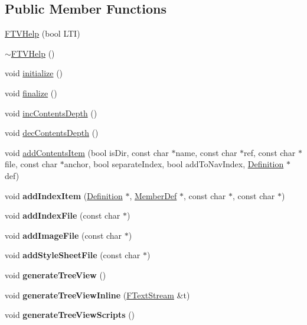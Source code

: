 \subsection*{Public Member Functions}
\begin{DoxyCompactItemize}
\item 
\mbox{\hyperlink{class_f_t_v_help_a7e7d72cccba33233dd89c6280b9ca101}{F\+T\+V\+Help}} (bool L\+TI)
\item 
\mbox{\hyperlink{class_f_t_v_help_aacb475096471a3b51feb4b247a41e27c}{$\sim$\+F\+T\+V\+Help}} ()
\item 
void \mbox{\hyperlink{class_f_t_v_help_a791c63d8c0dc72e7fedc4f17163dbfa3}{initialize}} ()
\item 
void \mbox{\hyperlink{class_f_t_v_help_a595c544e98100ca8aa84aaea4ac28e9f}{finalize}} ()
\item 
void \mbox{\hyperlink{class_f_t_v_help_a86381415dd788cb4a1a0feac8d5316d8}{inc\+Contents\+Depth}} ()
\item 
void \mbox{\hyperlink{class_f_t_v_help_a5949816300bc9d6a104dfd8305aa4e6f}{dec\+Contents\+Depth}} ()
\item 
void \mbox{\hyperlink{class_f_t_v_help_a33acc17460ca075c566e0e01d33a6ee4}{add\+Contents\+Item}} (bool is\+Dir, const char $\ast$name, const char $\ast$ref, const char $\ast$file, const char $\ast$anchor, bool separate\+Index, bool add\+To\+Nav\+Index, \mbox{\hyperlink{class_definition}{Definition}} $\ast$def)
\item 
\mbox{\label{class_f_t_v_help_ab6a465f8d11ddb4766cbdb130c6bde7e}} 
void {\bfseries add\+Index\+Item} (\mbox{\hyperlink{class_definition}{Definition}} $\ast$, \mbox{\hyperlink{class_member_def}{Member\+Def}} $\ast$, const char $\ast$, const char $\ast$)
\item 
\mbox{\label{class_f_t_v_help_af1158bffd161d730771c7dfc426b98a4}} 
void {\bfseries add\+Index\+File} (const char $\ast$)
\item 
\mbox{\label{class_f_t_v_help_a1e3bbb2160fc857187fbc8c1dfbeb20d}} 
void {\bfseries add\+Image\+File} (const char $\ast$)
\item 
\mbox{\label{class_f_t_v_help_a4b8566ef5fe3441f6e7e22bb7493f047}} 
void {\bfseries add\+Style\+Sheet\+File} (const char $\ast$)
\item 
\mbox{\label{class_f_t_v_help_a0fe4b6eab80d4602256ee5edd59b78df}} 
void {\bfseries generate\+Tree\+View} ()
\item 
\mbox{\label{class_f_t_v_help_aa5eeeb50fc575807ae4b0c6aa7c547bc}} 
void {\bfseries generate\+Tree\+View\+Inline} (\mbox{\hyperlink{class_f_text_stream}{F\+Text\+Stream}} \&t)
\item 
\mbox{\label{class_f_t_v_help_aad2b0bf5b5d217f8e0b77b486fed3527}} 
void {\bfseries generate\+Tree\+View\+Scripts} ()
\end{DoxyCompactItemize}
